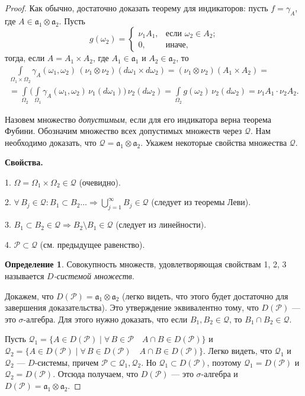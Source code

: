\documentclass[12pt,titlepage]{article}
\newcounter{tema}
\newcommand{\svoy}{\vspace{5pt}\noindent\textbf{Свойства.}}
\theoremstyle{definition}
\newtheorem{defen}{Определение}[tema]
\begin{document}
\begin{proof}
Как обычно, достаточно доказать теорему для индикаторов: пусть
$f=\gamma_{A}$, где $A\in\mathfrak{a}_1\otimes\mathfrak{a}_2$. Пусть
$$g(\omega_2)=
\begin{cases}
\nu_1A_1,&\text{если $\omega_2\in A_2$;}\\
0,&\text{иначе},
\end{cases}$$
тогда, если $A=A_1\times A_2$, где $A_1\in\mathfrak{a_1}$ и
$A_2\in\mathfrak{a_2}$, то
\begin{multline*}
\int\limits_{\Omega_1\times\Omega_2}\!\gamma_A(\omega_1,\omega_2) \,
(\nu_1\otimes\nu_2)(d\omega_1\times
d\omega_2)=(\nu_1\otimes\nu_2)(A_1\times A_2)=\\
=\int\limits_{\Omega_2}\Big(\int\limits_{\Omega_1}\!\gamma_A(\omega_1,
\omega_2)\,\nu_1(d\omega_1)\Big)\,\nu_2(d\omega_2)=\int\limits_{\Omega_2}\!
g(\omega_2)\,\nu_2(d\omega_2)=\nu_1A_1\cdot\nu_2A_2.
\end{multline*}

Назовем множество \emph{допустимым}, если для его индикатора верна
теорема Фубини. Обозначим множество всех допустимых множеств через
$\mathcal{Q}$. Нам необходимо доказать, что
$\mathcal{Q}=\mathfrak{a}_1\otimes\mathfrak{a}_2$. Укажем некоторые
свойства множества $\mathcal{Q}$.

\svoy

1. $\Omega=\Omega_1\times\Omega_2\in\mathcal{Q}$ (очевидно).

2. $\forall\,B_j\in\mathcal{Q}:B_1\subset B_2\ldots\Rightarrow
\bigcup\limits_{j=1}^\infty B_j\in\mathcal{Q}$ (следует из теоремы
Леви).

3. $B_1\subset B_2\in\mathcal{Q}\Rightarrow B_2\setminus
B_1\in\mathcal{Q}$ (следует из линейности).

4. $\mathcal{P}\subset\mathcal{Q}$ (см. предыдущее равенство).

\begin{defen}
Совокупность множеств, удовлетворяющая свойствам 1, 2, 3 называется
\emph{$D$-системой множеств}.
\end{defen}

Докажем, что $D(\mathcal{P})=\mathfrak{a}_1\otimes\mathfrak{a}_2$
(легко видеть, что этого будет достаточно для завершения
доказательства). Это утверждение эквивалентно тому, что
$D(\mathcal{P})$ --- это $\sigma$-алгебра. Для этого нужно доказать,
что если $B_1,B_2\in \mathcal{Q}$, то $B_1\cap B_2\in\mathcal{Q}$.

Пусть $\mathcal{Q}_1=\{A\in D(\mathcal{P})\mid \forall\,B\in
\mathcal{P}\quad A\cap B\in D(\mathcal{P})\}$ и
$\mathcal{Q}_2=\{A\in D(\mathcal{P})\mid \forall\,B\in
D(\mathcal{P})\quad A\cap B\in D(\mathcal{P})\}$. Легко видеть, что
$\mathcal{Q}_1$ и $\mathcal{Q}_2$ --- $D$-системы, причем
$\mathcal{P}\subset\mathcal{Q}_1,\mathcal{Q}_2$. Но
$\mathcal{Q}_1\subset D(\mathcal{P})$, поэтому
$\mathcal{Q}_1=D(\mathcal{P})$ и $\mathcal{Q}_2=D(\mathcal{P})$.
Отсюда получаем, что $D(\mathcal{P})$ --- это $\sigma$-алгебра и
$D(\mathcal{P})=\mathfrak{a}_1\otimes\mathfrak{a}_2$.
\end{proof}
\end{document}
